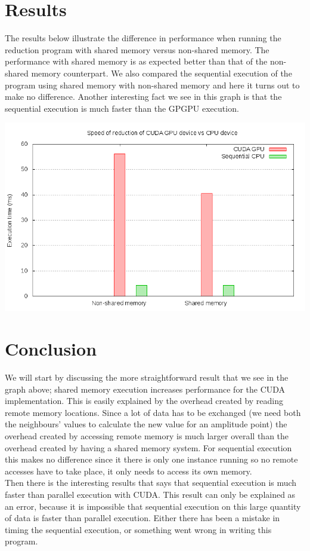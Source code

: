 \documentclass[a4paper,12px]{article}
\begin{document}
\section{Results}

The results below illustrate the difference in performance when running the
reduction program with shared memory versus non-shared memory. The performance
with shared memory is as expected better than that of the non-shared memory
counterpart. We also compared the sequential execution of the program using
shared memory with non-shared memory and here it turns out to make no
difference.
Another interesting fact we see in this graph is that the sequential execution
is much faster than the GPGPU execution.

\begin{center}
    \includegraphics[width=\textwidth]{reduce-max}
\end{center}

\section{Conclusion}

We will start by discussing the more straightforward result that we see in the
graph above; shared memory execution increases performance for the CUDA
implementation. This is easily explained by the overhead created by
reading remote memory locations. Since a lot of data has to be exchanged (we
need both the neighbours' values to calculate the new value for an amplitude
point) the overhead created by accessing remote memory is much larger overall
than the overhead created by having a shared memory system.
For sequential execution this makes no difference since it there is only one
instance running so no remote accesses have to take place, it only needs to
access its own memory. \\
Then there is the interesting results that says that sequential execution is
much faster than parallel execution with CUDA. This result can only be explained
as an error, because it is impossible that sequential execution on this large
quantity of data is faster than parallel execution. Either there has been a
mistake in timing the sequential execution, or something went wrong in writing
this program.




%
%
\end{document}
